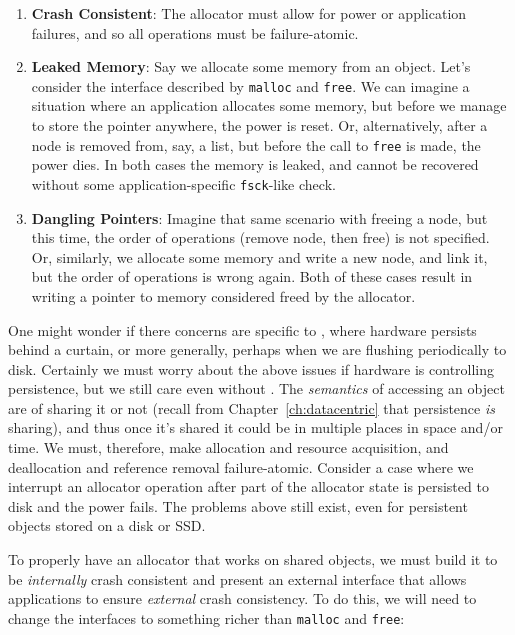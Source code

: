 \begin{enumerate}
    \item \textbf{Crash Consistent}: The allocator must allow for power or application failures, and so
          all operations must be failure-atomic.
    \item \textbf{Leaked Memory}: Say we allocate some memory from an object. Let's consider the interface described
          by \texttt{malloc} and \texttt{free}. We can imagine a situation where an application allocates some memory, but
          before we manage to store the pointer anywhere, the power is reset. Or, alternatively, after a node is removed from,
          say, a list, but before the call to \texttt{free} is made, the power dies. In both cases the memory is leaked, and
          cannot be recovered without some application-specific \texttt{fsck}-like check.
    \item \textbf{Dangling Pointers}: Imagine that same scenario with freeing a node, but this time, the order of operations
          (remove node, then free) is not specified. Or, similarly, we allocate some memory and write a new node, and link it, but the order of operations is
          wrong again. Both of these cases result in writing a pointer to memory considered freed by the allocator.
\end{enumerate}

One might wonder if there concerns are specific to \NVM, where hardware persists behind a curtain, or more generally,
perhaps when we are flushing periodically to disk. Certainly we must worry about the above issues if hardware is
controlling persistence, but we still care even without \NVM. The \emph{semantics} of accessing an object are of sharing
it or not (recall from Chapter~\ref{ch:datacentric} that persistence \emph{is} sharing), and thus once it's shared it
could be in multiple places in space and/or time. We must, therefore, make allocation and resource acquisition, and
deallocation and reference removal failure-atomic. Consider a case where we interrupt an allocator operation after part
of the allocator state is persisted to disk and the power fails. The problems above still exist, even for persistent
objects stored on a disk or SSD.

To properly have an allocator that works on shared objects, we must build it to be \emph{internally} crash consistent and
present an external interface that allows applications to ensure \emph{external} crash consistency.
To do this, we will
need to change the interfaces to something richer than \texttt{malloc} and \texttt{free}:

